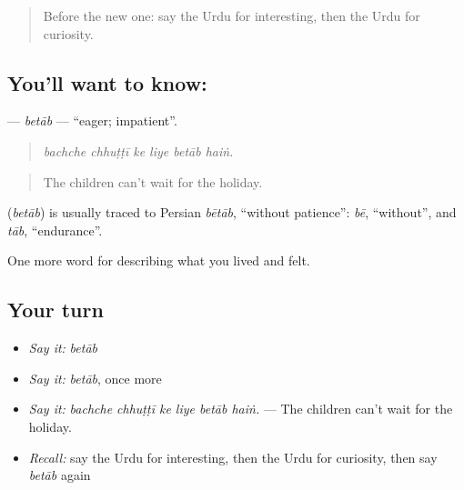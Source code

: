 \label{lesson:UR-C448-betab}



\begin{quote}
Before the new one: say the Urdu for interesting, then the Urdu for curiosity.
\end{quote}

\subsection*{You'll want to know: }
\textbf{} — \emph{betāb} — \textquotedblleft{}eager; impatient\textquotedblright{}.

\begin{quote}
     
\end{quote}

\begin{quote}
\emph{bachche chhuṭṭī ke liye betāb haiṅ.}
\end{quote}

\begin{quote}
The children can't wait for the holiday.
\end{quote}

\begin{cousinweb}
\textbf{} (\emph{betāb}) is usually traced to Persian \emph{bētāb}, \textquotedblleft{}without patience\textquotedblright{}: \emph{bē}, \textquotedblleft{}without\textquotedblright{}, and \emph{tāb}, \textquotedblleft{}endurance\textquotedblright{}.
\end{cousinweb}

\begin{grammarlens}[title={What you've built}]
One more word for describing what you lived and felt.
\end{grammarlens}

\subsection*{Your turn}
\begin{itemize}
\raggedright
  \item \emph{Say it:} \emph{betāb}
  \item \emph{Say it:} \emph{betāb}, once more
  \item \emph{Say it:} \emph{bachche chhuṭṭī ke liye betāb haiṅ.} — The children can't wait for the holiday.
  \item \emph{Recall:} say the Urdu for interesting, then the Urdu for curiosity, then say \emph{betāb} again
\end{itemize}

